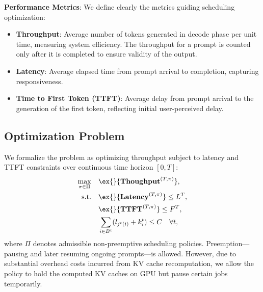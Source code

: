 \textbf{Performance Metrics}: We define clearly the metrics guiding scheduling optimization:
\begin{itemize}
    \item \textbf{Throughput}: Average number of tokens generated in decode phase per unit time, measuring system efficiency. The throughput for a prompt is counted only after it is completed to ensure validity of the output.
    \item \textbf{Latency}: Average elapsed time from prompt arrival to completion, capturing responsiveness.
    \item \textbf{Time to First Token (TTFT)}: Average delay from prompt arrival to the generation of the first token, reflecting initial user-perceived delay.
\end{itemize}

\subsection{Optimization Problem}
We formalize the problem as optimizing throughput subject to latency and TTFT constraints over continuous time horizon $[0,T]$:
\begin{equation*}
    \begin{aligned}
            \max_{\pi \in \Pi} \quad &\ex{}{\throughput^{(T,\pi)}}, \\
    \text{s.t.}\quad & \ex{}{\Latency^{(T,\pi)}} \le L^T,\\
    & \ex{}{\TTFT^{(T,\pi)}} \le F^T, \\
    & \sum_{i \in B^t} (l_{j^t(i)} + k^t_i) \le C \quad \forall t,
    \end{aligned}
\end{equation*}
where $\Pi$ denotes admissible non-preemptive scheduling policies. Preemption—pausing and later resuming ongoing prompts—is allowed. However, due to substantial overhead costs incurred from KV cache recomputation, we allow the policy to hold the computed KV caches on GPU but pause certain jobs temporarily. 


